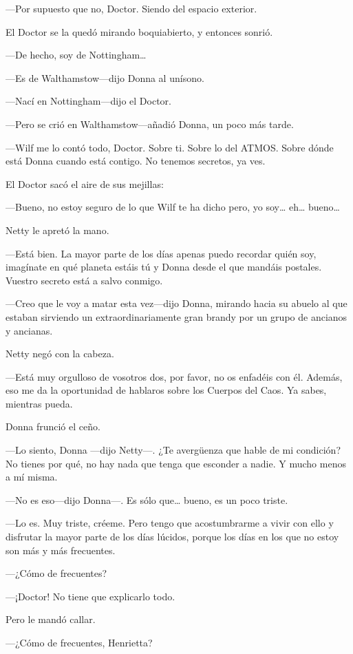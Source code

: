 ---Por supuesto que no, Doctor. Siendo del espacio exterior.

El Doctor se la quedó mirando boquiabierto, y entonces sonrió.

---De hecho, soy de Nottingham\ldots{}

---Es de Walthamstow---dijo Donna al unísono.

---Nací en Nottingham---dijo el Doctor.

---Pero se crió en Walthamstow---añadió Donna, un poco más tarde.

---Wilf me lo contó todo, Doctor. Sobre ti. Sobre lo del ATMOS. Sobre
dónde está Donna cuando está contigo. No tenemos secretos, ya ves.

El Doctor sacó el aire de sus mejillas:

---Bueno, no estoy seguro de lo que Wilf te ha dicho pero, yo
soy\ldots{} eh\ldots{} bueno\ldots{}

Netty le apretó la mano.

---Está bien. La mayor parte de los días apenas puedo recordar quién
soy, imagínate en qué planeta estáis tú y Donna desde el que mandáis
postales. Vuestro secreto está a salvo conmigo.

---Creo que le voy a matar esta vez---dijo Donna, mirando hacia su
abuelo al que estaban sirviendo un extraordinariamente gran brandy por
un grupo de ancianos y ancianas.

Netty negó con la cabeza.

---Está muy orgulloso de vosotros dos, por favor, no os enfadéis con él.
Además, eso me da la oportunidad de hablaros sobre los Cuerpos del Caos.
Ya sabes, mientras pueda.

Donna frunció el ceño.

---Lo siento, Donna ---dijo Netty---. ¿Te avergüenza que hable de mi
condición? No tienes por qué, no hay nada que tenga que esconder a
nadie. Y mucho menos a mí misma.

---No es eso---dijo Donna---. Es sólo que\ldots{} bueno, es un poco
triste.

---Lo es. Muy triste, créeme. Pero tengo que acostumbrarme a vivir con
ello y disfrutar la mayor parte de los días lúcidos, porque los días en
los que no estoy son más y más frecuentes.

---¿Cómo de frecuentes?

---¡Doctor! No tiene que explicarlo todo.

Pero le mandó callar.

---¿Cómo de frecuentes, Henrietta?

